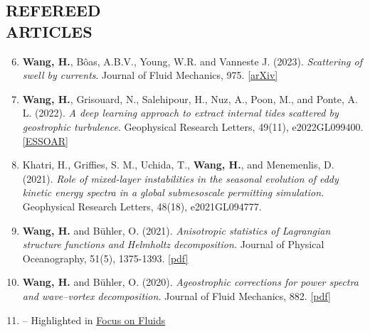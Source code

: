 \documentclass[margin]{res}
\newenvironment{benumerate}[1]{
    \let\oldItem\item
    \def\item{\addtocounter{enumi}{-2}\oldItem}
    \begin{enumerate}[leftmargin=*,noitemsep]
    \setcounter{enumi}{#1}
    \addtocounter{enumi}{1}
}{
    \end{enumerate}
}
\begin{document}
\begin{resume}


\section{{\normalfont REFEREED\\ARTICLES}}
\begin{benumerate}{5}
\item \textbf{Wang, H.}, B\^{o}as, A.B.V., Young, W.R. and Vanneste J. (2023). \textit{Scattering of swell by currents}. Journal of Fluid Mechanics, 975.  \href{https://arxiv.org/abs/2305.12163}{[arXiv]}
\item \textbf{Wang, H.}, Grisouard, N., Salehipour, H., Nuz, A., Poon, M., and Ponte, A. L. (2022). \textit{A deep learning approach to extract internal tides scattered by geostrophic turbulence}. Geophysical Research Letters, 49(11), e2022GL099400. \href{https://essopenarchive.org/doi/full/10.1002/essoar.10508849.2}{[ESSOAR]}
\item Khatri, H., Griffies, S. M., Uchida, T., \textbf{Wang, H.},  and Menemenlis, D. (2021). \textit{Role of mixed-layer instabilities in the seasonal evolution of eddy kinetic energy spectra in a global submesoscale permitting simulation.} Geophysical Research Letters, 48(18), e2021GL094777.
\item \textbf{Wang, H.} and B{\"u}hler, O. (2021). \textit{Anisotropic statistics of Lagrangian structure functions and Helmholtz decomposition.} Journal of Physical Oceanography, 51(5), 1375-1393. \href{https://hannnwang.github.io/WangBuhlerJPO21.pdf}{[pdf]}
\item \textbf{Wang, H.} and B{\"u}hler, O. (2020). \textit{Ageostrophic corrections for power spectra and wave–vortex decomposition.} Journal of Fluid Mechanics, 882. \href{https://hannnwang.github.io/AgeoSpectraJFM20.pdf}{[pdf]}
\item[] -- Highlighted in \href{https://www.cambridge.org/core/journals/journal-of-fluid-mechanics/article/untangling-waves-and-vortices-in-the-atmospheric-kinetic-energy-spectra/1BEB1ABC32CD2CFAB99BAFEE4712CD0C}{Focus on Fluids}
\end{benumerate}


\end{resume}
\end{document}
